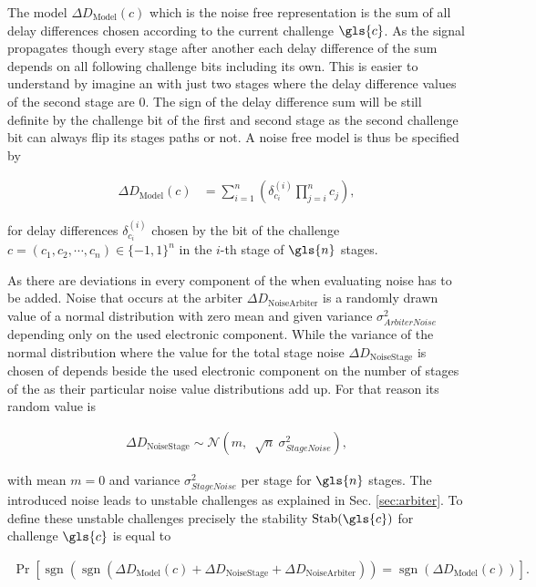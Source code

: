 The model $\Delta D_{\mathrm{Model}}(c)$ which is the noise free \apuf representation is the sum of all delay differences chosen according to the current challenge $\gls{c}$.
As the signal propagates though every stage after another each delay difference of the sum depends on all following challenge bits including its own.
This is easier to understand by imagine an \apuf with just two stages where the delay difference values of the second stage are 0. 
The sign of the delay difference sum will be still definite by the challenge bit of the first and second stage as the second challenge bit can always flip its stages paths or not.
A noise free \apuf model is thus be specified by

\begin{align*}
\Delta D_{\mathrm{Model}}(c) &= \sum_{i=1}^{n}\left(\delta_{c_{i}}^{(i)}\prod_{j=i}^{n}c_{j}\right),
\end{align*}

for delay differences $\delta_{c_{i}}^{(i)}$ chosen by the bit of the challenge $c = (c_1, c_2, \cdots, c_n) \in \{-1, 1\}^n$ in the $i$-th stage of $\gls{n}$ stages.

As there are deviations in every component of the \puf when evaluating noise has to be added.
Noise that occurs at the arbiter $\Delta D_{\mathrm{Noise Arbiter}}$ is a randomly drawn value of a normal distribution with zero mean and given variance $\sigma_{Arbiter Noise}^2$ depending only on the used electronic component.
While the variance of the normal distribution where the value for the total stage noise $\Delta D_{\mathrm{Noise Stage}}$ is chosen of depends beside the used electronic component on the number of stages of the \apuf as their particular noise value distributions add up.
For that reason its random value is 

\begin{align*}
\Delta D_{\mathrm{Noise Stage}} \sim \mathcal{N} (m,\ \sqrt[]{n}\ \sigma_{Stage Noise}^2),
\end{align*}

with mean $m = 0$ and variance $\sigma_{Stage Noise}^2$ per stage for $\gls{n}$ stages.
The introduced noise leads to unstable challenges as explained in Sec. \ref{sec:arbiter}.
To define these unstable challenges precisely the stability $\Stab(\gls{c})$ for challenge $\gls{c}$ is equal to

\begin{align*}
\Pr[\operatorname{sgn}(\operatorname{sgn}(\Delta D_{\mathrm{Model}}(c) + \Delta D_{\mathrm{Noise Stage}} + \Delta D_{\mathrm{Noise Arbiter}})) = \operatorname{sgn}(\Delta D_{\mathrm{Model}}(c))].
\end{align*}

